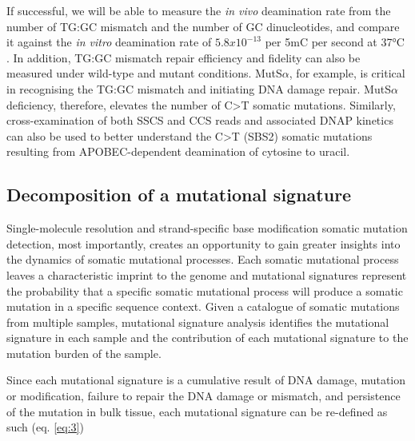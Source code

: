If successful, we will be able to measure the \textit{in vivo} deamination rate from the number of TG:GC mismatch and the number of GC dinucleotides, and compare it against the \textit{in vitro} deamination rate of $5.8x10^{-13}$ per 5mC per second at 37°C \cite{Shen1994-of}. In addition, TG:GC mismatch repair efficiency and fidelity can also be measured under wild-type and mutant conditions. MutS$\alpha$, for example, is critical in recognising the TG:GC mismatch and initiating DNA damage repair. MutS$\alpha$ deficiency, therefore, elevates the number of C>T somatic mutations. Similarly, cross-examination of both SSCS and CCS reads and associated DNAP kinetics can also be used to better understand the C>T (SBS2) somatic mutations resulting from APOBEC-dependent deamination of cytosine to uracil.  

\subsection{Decomposition of a mutational signature}

Single-molecule resolution and strand-specific base modification somatic mutation detection, most importantly, creates an opportunity to gain greater insights into the dynamics of somatic mutational processes. Each somatic mutational process leaves a characteristic imprint to the genome and mutational signatures represent the probability that a specific somatic mutational process will produce a somatic mutation in a specific sequence context. Given a catalogue of somatic mutations from multiple samples, mutational signature analysis identifies the mutational signature in each sample and the contribution of each mutational signature to the mutation burden of the sample.

Since each mutational signature is a cumulative result of DNA damage, mutation or modification, failure to repair the DNA damage or mismatch, and persistence of the mutation in bulk tissue, each mutational signature can be re-defined as such (eq. \ref{eq:3})

